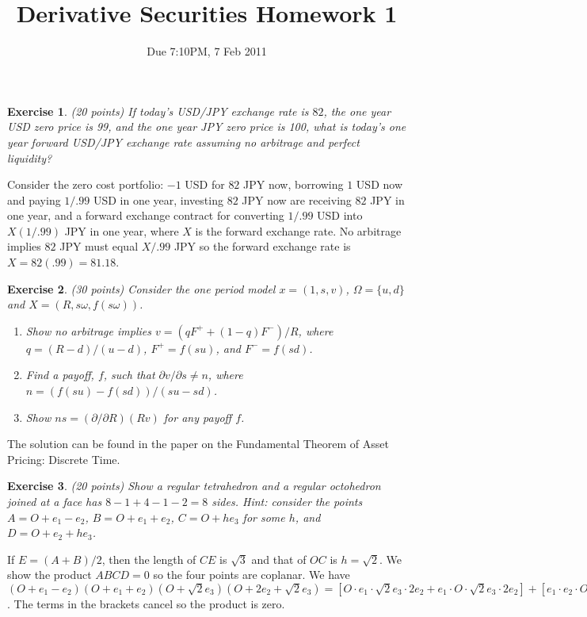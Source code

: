 \documentclass[11pt,fleqn]{amsproc}
\newtheorem{xca}{Exercise}
\begin{document}
\title{Derivative Securities Homework 1}
\author{Due 7:10PM, 7 Feb 2011}

\maketitle

\begin{xca}{(20 points)}
If today's USD/JPY exchange rate is $82$, the one year USD zero price is 99,
and the one year JPY zero price is 100, what is today's one year forward 
USD/JPY exchange rate assuming no arbitrage and perfect liquidity?
\end{xca}

Consider the zero cost portfolio: $-1$ USD for $82$ JPY now, borrowing
$1$ USD now and paying $1/.99$ USD in one year, investing $82$ JPY now
are receiving $82$ JPY in one year, and a forward exchange contract
for converting $1/.99$ USD into $X(1/.99)$ JPY in one year, where $X$
is the forward exchange rate. No arbitrage implies
$82$ JPY must equal $X/.99$ JPY so the forward exchange rate
is $X = 82(.99) = 81.18$.

\begin{xca}{(30 points)}
Consider the one period model $x = (1, s, v)$,
$\Omega = \{u, d\}$ and $X = (R, s\omega, f(s\omega))$.
\begin{enumerate}
\item Show no arbitrage implies $v = (qF^+ + (1 - q)F^-)/R$, where
$q = (R - d)/(u - d)$, $F^+ = f(su)$, and $F^- = f(sd)$.
\item Find a payoff, $f$, such that $\partial v/\partial s \not= n$, where
$n = (f (su) - f (sd))/(su - sd)$.
\item Show $ns = (\partial/\partial R)(Rv)$ for any payoff $f$.
\end{enumerate}
\end{xca}

The solution can be found in the paper on the Fundamental Theorem
of Asset Pricing: Discrete Time.

\begin{xca}{(20 points)}
Show a regular tetrahedron and a regular octohedron joined at a face
has $8 - 1 + 4 - 1 - 2 = 8$ sides. Hint: consider the points
$A = O + e_1 - e_2$, $B = O + e_1 + e_2$, $C = O + h e_3$ for some $h$, and
$D = O + e_2 + h e_3$.
\end{xca}

If $E = (A + B)/2$, then the length of $CE$ is $\sqrt{3}$ and
that of $OC$ is $h = \sqrt{2}$. We show the product
$ABCD = 0$ so the four points are coplanar.
We have $(O + e_1 - e_2)(O + e_1 + e_2)(O + \sqrt{2}e_3)
(O + 2e_2 + \sqrt{2}e_3) = 
[O\cdot e_1\cdot \sqrt{2} e_3\cdot 2e_2
+e_1\cdot O\cdot \sqrt{2} e_3\cdot 2e_2]
+[e_1\cdot e_2\cdot O\cdot \sqrt{2}e_3
+e_1\cdot O\cdot e_2\cdot \sqrt{2}e_3]
+[-e_2\cdot e_1\cdot O\cdot \sqrt{2}e_3
-e_2\cdot e_1\cdot \sqrt{2}e_3\cdot O]$.
The terms in the brackets cancel so the product is zero.
\end{document}
